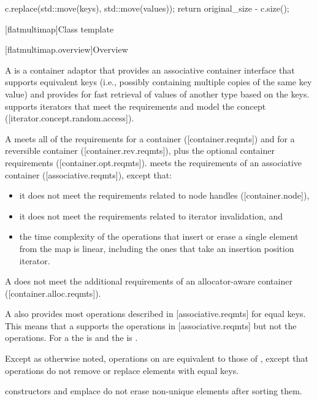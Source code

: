 \begin{addedblock}
\begin{itemdescr}
\begin{codeblock}
c.replace(std::move(keys), std::move(values));
return original_size - c.size();
\end{codeblock}
\end{itemdescr}

[flatmultimap]{Class template }

[flatmultimap.overview]{Overview}

\pnum
{}%
A  is a container adaptor that provides an associative
container interface that supports equivalent keys (i.e., possibly containing
multiple copies of the same key value) and provides for fast retrieval of
values of another type  based on the keys. 
supports iterators that meet the  requirements
and model the  concept
([iterator.concept.random.access]).

\pnum
A  meets all of the requirements for a container
([container.reqmts]) and for a reversible container ([container.rev.reqmts]),
plus the optional container requirements ([container.opt.reqmts]).  
meets the requirements of an associative container ([associative.reqmts]), except that:
\begin{itemize}
\item it does not meet the requirements related to node handles ([container.node]),
\item it does not meet the requirements related to iterator invalidation, and
\item the time complexity of the operations that insert or erase a single
element from the map is linear, including the ones that take an insertion
position iterator.
\end{itemize}
\begin{note}A  does not meet the additional requirements of an
allocator-aware container ([container.alloc.reqmts]).\end{note}

\pnum
A  also provides most operations described
in [associative.reqmts] for equal keys.  This means that a
 supports the  operations
in [associative.reqmts] but not the  operations.  For
a  the  is  and the
 is .

\pnum
Except as otherwise noted, operations on  are equivalent
to those of , except that  operations do
not remove or replace elements with equal keys.  \begin{example}
constructors and emplace do not erase non-unique elements after sorting them.\end{example}


\end{addedblock}
